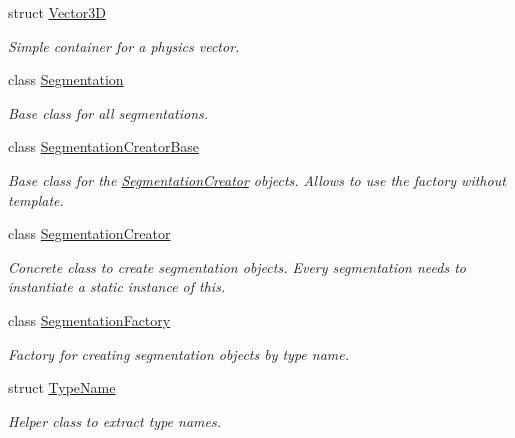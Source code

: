 \begin{DoxyCompactItemize}
\item 
struct \hyperlink{struct_d_d4hep_1_1_d_d_segmentation_1_1_vector3_d}{Vector3D}
\begin{DoxyCompactList}\small\item\em Simple container for a physics vector. \item\end{DoxyCompactList}\item 
class \hyperlink{class_d_d4hep_1_1_d_d_segmentation_1_1_segmentation}{Segmentation}
\begin{DoxyCompactList}\small\item\em Base class for all segmentations. \item\end{DoxyCompactList}\item 
class \hyperlink{class_d_d4hep_1_1_d_d_segmentation_1_1_segmentation_creator_base}{SegmentationCreatorBase}
\begin{DoxyCompactList}\small\item\em Base class for the \hyperlink{class_d_d4hep_1_1_d_d_segmentation_1_1_segmentation_creator}{SegmentationCreator} objects. Allows to use the factory without template. \item\end{DoxyCompactList}\item 
class \hyperlink{class_d_d4hep_1_1_d_d_segmentation_1_1_segmentation_creator}{SegmentationCreator}
\begin{DoxyCompactList}\small\item\em Concrete class to create segmentation objects. Every segmentation needs to instantiate a static instance of this. \item\end{DoxyCompactList}\item 
class \hyperlink{class_d_d4hep_1_1_d_d_segmentation_1_1_segmentation_factory}{SegmentationFactory}
\begin{DoxyCompactList}\small\item\em Factory for creating segmentation objects by type name. \item\end{DoxyCompactList}\item 
struct \hyperlink{struct_d_d4hep_1_1_d_d_segmentation_1_1_type_name}{TypeName}
\begin{DoxyCompactList}\small\item\em Helper class to extract type names. \item\end{DoxyCompactList}\item 

\end{DoxyCompactItemize}
